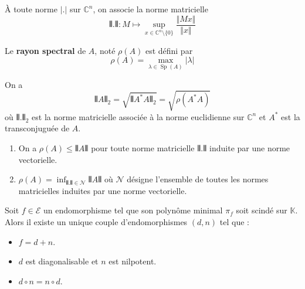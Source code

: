   \begin{notation}
    À toute norme $\vert . \vert$ sur $\mathbb{C}^n$, on associe la norme matricielle
    \[ \VERT . \VERT : M \mapsto \sup_{x \in \mathbb{C}^n \setminus \{ 0 \}} \frac{\Vert Mx \Vert}{\Vert x \Vert} \]
  \end{notation}
  
  \begin{definition}
    Le \textbf{rayon spectral} de $A$, noté $\rho(A)$ est défini par
    \[ \rho(A) = \max_{\lambda \in \operatorname{Sp}(A)} \vert \lambda \vert \]
  \end{definition}
  
  \begin{theorem}
    On a
    \[ \VERT A \VERT_2 = \sqrt{\VERT A^* A \VERT_2} = \sqrt{\rho(A^* A)} \]
    où $\VERT . \VERT_2$ est la norme matricielle associée à la norme euclidienne sur $\mathbb{C}^n$ et $A^*$ est la transconjuguée de $A$.
  \end{theorem}
  
  \begin{theorem}
    \begin{enumerate}[label=(\roman*)]
      \item On a $\rho(A) \leq \VERT A \VERT$ pour toute norme matricielle $\VERT . \VERT$ induite par une norme vectorielle.
      \item $\rho(A) = \inf_{\VERT . \VERT \in \mathcal{N}} \VERT A \VERT$ où $\mathcal{N}$ désigne l'ensemble de toutes les normes matricielles induites par une norme vectorielle.
    \end{enumerate}
  \end{theorem}
  
  
  \begin{theorem}
    Soit $f \in \mathcal{E}$ un endomorphisme tel que son polynôme minimal $\pi_f$ soit scindé sur $\mathbb{K}$. Alors il existe un unique couple d'endomorphismes $(d, n)$ tel que :
    \begin{itemize}
      \item $f = d + n$.
      \item $d$ est diagonalisable et $n$ est nilpotent.
      \item $d \circ n = n \circ d$.
    \end{itemize}
  \end{theorem}
  
  
